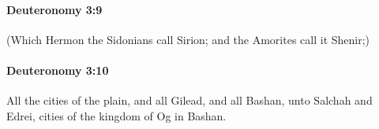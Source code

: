 		\paragraph{Deuteronomy 3:9} %
			\label{DEUTERONOMY-3-9}

			(Which Hermon the Sidonians call Sirion; and the Amorites call it Shenir;)


		\paragraph{Deuteronomy 3:10} %
			\label{DEUTERONOMY-3-10}

			All the cities of the plain, and all Gilead, and all Bashan, unto Salchah and Edrei, cities of the kingdom of Og in Bashan.


